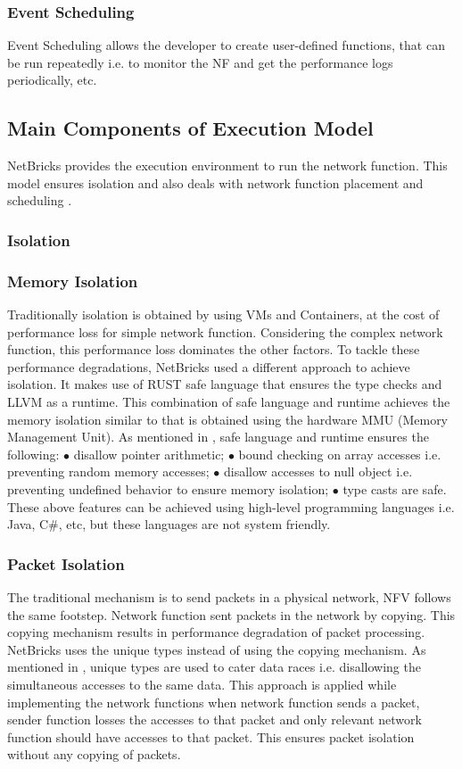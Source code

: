 \documentclass[10pt, a4paper, conference]{IEEEtran}
\begin{document}
\subsubsection{Event Scheduling}
Event Scheduling allows the developer to create user-defined functions, that can be run repeatedly i.e. to monitor the NF and get the performance logs periodically, etc.
\subsection{Main Components of Execution Model}
NetBricks provides the execution environment to run the network function. This model ensures isolation and also deals with network function placement and scheduling \cite{Panda2016}.
\subsubsection*{Isolation}
\subsubsection{Memory Isolation}
Traditionally isolation is obtained by using VMs and Containers, at the cost of performance loss for simple network function. Considering the complex network function, this performance loss dominates the other factors. To tackle these performance degradations, NetBricks used a different approach to achieve isolation. It makes use of RUST \cite{TheRustTeam2016} safe language that ensures the type checks and LLVM \cite{Lattner} as a runtime. This combination of safe language and runtime achieves the memory isolation similar to that is obtained using the hardware MMU (Memory Management Unit). As mentioned in \cite{Panda2016}, safe language and runtime ensures the following: $\bullet$ disallow pointer arithmetic; $\bullet$ bound checking on array accesses i.e. preventing random memory accesses; $\bullet$ disallow accesses to null object i.e. preventing undefined behavior to ensure memory isolation; $\bullet$ type casts are safe. These above features can be achieved using high-level programming languages i.e. Java, C\#, etc, but these languages are not system friendly. 
\subsubsection{Packet Isolation}
The traditional mechanism is to send packets in a physical network, NFV follows the same footstep. Network function sent packets in the network by copying. This copying mechanism results in performance degradation of packet processing. NetBricks uses the unique types \cite{Gordon} instead of using the copying mechanism. As mentioned in \cite{Panda2016}, unique types are used to cater data races i.e. disallowing the simultaneous accesses to the same data. This approach is applied while implementing the network functions when network function sends a packet, sender function losses the accesses to that packet and only relevant network function should have accesses to that packet. This ensures packet isolation without any copying of packets.
\end{document}
